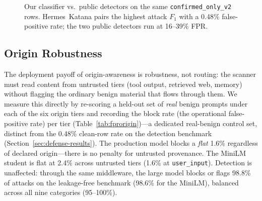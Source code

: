 \documentclass{article}
\begin{document}
\begin{figure}[t]
\centering
{}
\caption{Our classifier vs.\ public detectors on the same \texttt{confirmed\_only\_v2} rows. Hermes~Katana pairs the highest attack $F_1$ with a 0.48\% false-positive rate; the two public detectors run at 16--39\% FPR.}
\label{fig:defense}
\end{figure}



\subsection{Origin Robustness}
\label{sec:origin-robust}

The deployment payoff of origin-awareness is robustness, not routing: the scanner must read content from untrusted tiers (tool output, retrieved web, memory) without flagging the ordinary benign material that flows through them. We measure this directly by re-scoring a held-out set of \emph{real} benign prompts under each of the six origin tiers and recording the block rate (the operational false-positive rate) per tier (Table~\ref{tab:fprorigin})---a dedicated real-benign control set, distinct from the 0.48\% clean-row rate on the detection benchmark (Section~\ref{sec:defense-results}). The production model blocks a \emph{flat} 1.6\% regardless of declared origin---there is no penalty for untrusted provenance. The MiniLM student is flat at 2.4\% across untrusted tiers (1.6\% at \texttt{user\_input}). Detection is unaffected: through the same middleware, the large model blocks or flags 98.8\% of attacks on the leakage-free benchmark (98.6\% for the MiniLM), balanced across all nine categories (95--100\%).
\end{document}
